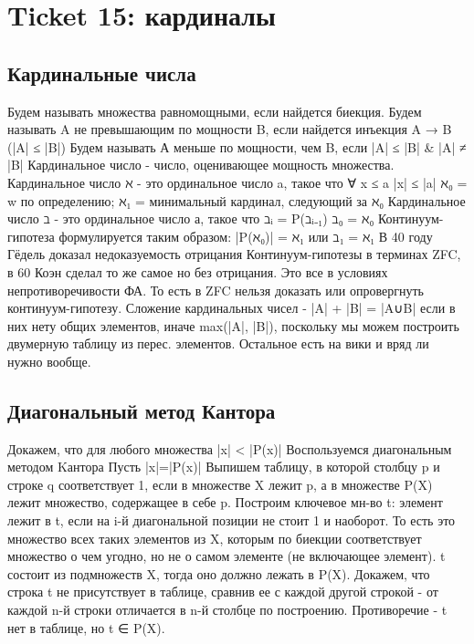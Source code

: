 \documentclass[11pt]{article}
\begin{document}
\section{Ticket 15: кардиналы}
\label{sec-17}
\subsection{Кардинальные числа}
\label{sec-17-1}
Будем называть множества равномощными, если найдется биекция.
Будем называть A не превышающим по мощности B, если найдется
инъекция A → B (|A| ≤ |B|)
Будем называть А меньше по мощности, чем B, если |A| ≤ |B| \& |A| ≠ |B|
Кардинальное число - число, оценивающее мощность множества.
Кардинальное число ℵ - это ординальное число a, такое что
∀ x ≤ a |x| ≤ |a|
ℵ₀ = w по определению; ℵ₁ = минимальный кардинал, следующий за ℵ₀
Кардинальное число ℶ - это ординальное число а, такое что
ℶᵢ = P(ℶᵢ₋₁)
ℶ₀ = ℵ₀
Континуум-гипотеза формулируется таким образом: |P(ℵ₀)| = ℵ₁ или ℶ₁ = ℵ₁
В 40 году Гёдель доказал недоказуемость отрицания Континуум-гипотезы
в терминах ZFC, в 60 Коэн сделал то же самое но без отрицания. Это все
в условиях непротиворечивости ФА. То есть в ZFC нельзя доказать или
опровергнуть континуум-гипотезу.
Сложение кардинальных чисел - |A| + |B| = |A∪B| если в них
нету общих элементов, иначе max(|A|, |B|), поскольку мы можем
построить двумерную таблицу из перес. элементов.
Остальное есть на вики и вряд ли нужно вообще.
\subsection{Диагональный метод Кантора}
\label{sec-17-2}
Докажем, что для любого множества |x| < |P(x)|
Воспользуемся диагональным методом Kантора
Пусть |x|=|P(x)|
Выпишем таблицу, в которой  столбцу p и строке q соответствует
1, если в множестве X лежит p, а в множестве P(X) лежит
множество, содержащее в себе p. Построим ключевое мн-во t:
элемент лежит в t, если на i-й диагональной позиции не стоит 1
и наоборот. То есть это множество всех таких элементов из X,
которым по биекции соответствует множество о чем угодно, но не
о самом элементе (не включающее элемент).
t состоит из подмножеств X, тогда оно должно лежать в P(X).
Докажем, что строка t не присутствует в таблице, сравнив ее с
каждой другой строкой - от каждой n-й строки отличается в n-й
столбце по построению.
Противоречие - t нет в таблице, но t ∈ P(X).
\end{document}
